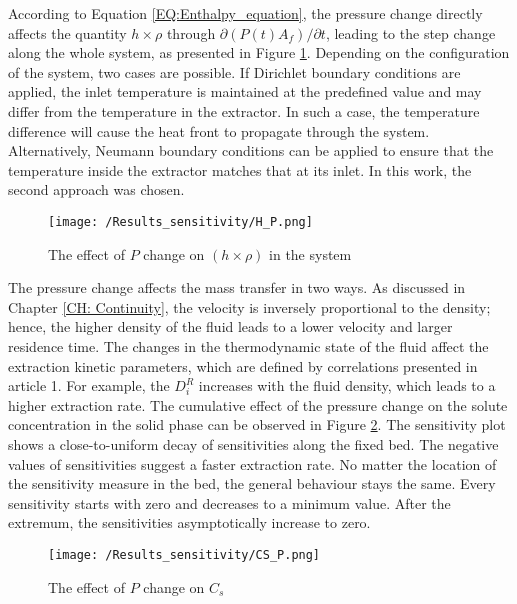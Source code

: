 \documentclass[../Article_Sensitivity_Analsysis.tex]{subfiles}
\begin{document}
	According to Equation \ref{EQ:Enthalpy_equation}, the pressure change directly affects the quantity $h \times \rho$ through $\partial (P(t) A_f) / \partial t$, leading to the step change along the whole system, as presented in Figure \ref{fig:Sensitivty_P_H}. Depending on the configuration of the system, two cases are possible. If Dirichlet boundary conditions are applied, the inlet temperature is maintained at the predefined value and may differ from the temperature in the extractor. In such a case, the temperature difference will cause the heat front to propagate through the system. Alternatively, Neumann boundary conditions can be applied to ensure that the temperature inside the extractor matches that at its inlet. In this work, the second approach was chosen.
    
    \begin{figure}[h!]
    	\centering
    	\texttt{[image: /Results\_sensitivity/H\_P.png]}
    	\caption{The effect of $P$ change on $(h \times \rho)$ in the system}
    	\label{fig:Sensitivty_P_H}
    \end{figure}

	The pressure change affects the mass transfer in two ways. As discussed in Chapter \ref{CH: Continuity}, the velocity is inversely proportional to the density; hence, the higher density of the fluid leads to a lower velocity and larger residence time. The changes in the thermodynamic state of the fluid affect the extraction kinetic parameters, which are defined by correlations presented in {\color{red}article 1}. For example, the $D_i^R$ increases with the fluid density, which leads to a higher extraction rate. The cumulative effect of the pressure change on the solute concentration in the solid phase can be observed in Figure \ref{fig:Sensitivty_P_CS}. The sensitivity plot shows a close-to-uniform decay of sensitivities along the fixed bed. The negative values of sensitivities suggest a faster extraction rate. No matter the location of the sensitivity measure in the bed, the general behaviour stays the same. Every sensitivity starts with zero and decreases to a minimum value. After the extremum, the sensitivities asymptotically increase to zero.

	\begin{figure}[h!]
		\centering
		\texttt{[image: /Results\_sensitivity/CS\_P.png]}
		\caption{The effect of $P$ change on $C_s$}
		\label{fig:Sensitivty_P_CS}
	\end{figure}
\end{document}
